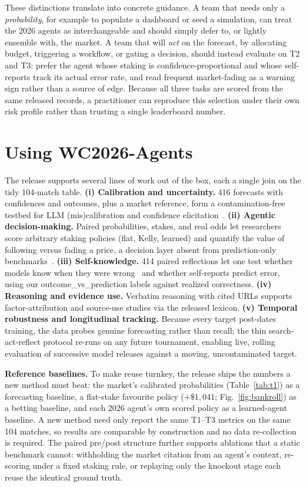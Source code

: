 \documentclass[sigconf,nonacm]{acmart}
\begin{document}
These distinctions translate into concrete guidance. A team that needs only a
\emph{probability}, for example to populate a dashboard or seed a simulation, can
treat the 2026 agents as interchangeable and should simply defer to, or lightly
ensemble with, the market. A team that will \emph{act} on the forecast, by
allocating budget, triggering a workflow, or gating a decision, should instead
evaluate on T2 and T3: prefer the agent whose staking is confidence-proportional
and whose self-reports track its actual error rate, and read frequent
market-fading as a warning sign rather than a source of edge. Because all three
tasks are scored from the same released records, a practitioner can reproduce
this selection under their own risk profile rather than trusting a single
leaderboard number.

\section{Using WC2026-Agents}
\label{sec:using}
The release supports several lines of work out of the box, each a single join on
the tidy 104-match table. \textbf{(i) Calibration and uncertainty.} 416
forecasts with confidences and outcomes, plus a market reference, form a
contamination-free testbed for LLM (mis)calibration and confidence
elicitation~\cite{tian2023calibration,xiong2024uncertainty}. \textbf{(ii) Agentic
decision-making.} Paired probabilities, stakes, and real odds let researchers
score arbitrary staking policies (flat, Kelly, learned) and quantify the value of
following versus fading a price, a decision layer absent from prediction-only
benchmarks~\cite{karger2024forecastbench}. \textbf{(iii) Self-knowledge.} 414
paired reflections let one test whether models know when they were
wrong~\cite{kadavath2022know,huang2024selfcorrect} and whether self-reports
predict error, using our \textsf{outcome\_vs\_prediction} labels against realized
correctness. \textbf{(iv) Reasoning and evidence use.} Verbatim reasoning with
cited URLs supports factor-attribution and source-use studies via the released
lexicon. \textbf{(v) Temporal robustness and longitudinal tracking.} Because every
target post-dates training, the data probes genuine forecasting rather than
recall; the thin search-act-reflect protocol re-runs on any future tournament,
enabling live, rolling evaluation of successive model releases against a moving,
uncontaminated target.

\textbf{Reference baselines.} To make reuse turnkey, the release ships the
numbers a new method must beat: the market's calibrated probabilities
(Table~\ref{tab:t1}) as a forecasting baseline, a flat-stake favourite policy
($+\$1{,}041$; Fig.~\ref{fig:bankroll}) as a betting baseline, and each 2026
agent's own scored policy as a learned-agent baseline. A new method need only
report the same T1--T3 metrics on the same 104 matches, so results are comparable
by construction and no data re-collection is required. The paired pre/post
structure further supports ablations that a static benchmark cannot: withholding
the market citation from an agent's context, re-scoring under a fixed staking
rule, or replaying only the knockout stage each reuse the identical ground truth.
\end{document}
